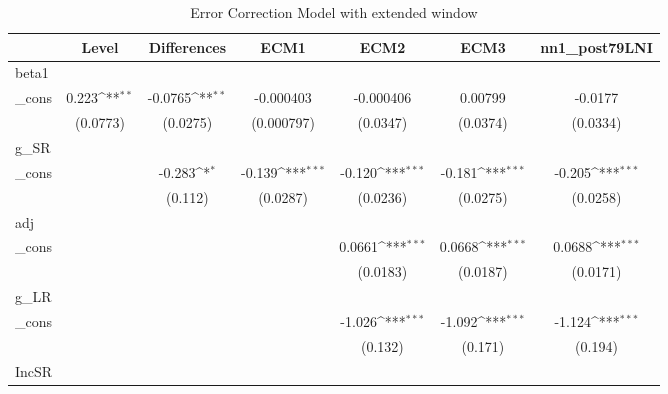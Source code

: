 \begin{table}[htbp]\centering
\def\sym#1{\ifmmode^{#1}\else\(^{#1}\)\fi}
\caption{Error Correction Model with extended window}
\begin{tabular}{l*{6}{c}}
\hline\hline
          &\multicolumn{1}{c}{Level}&\multicolumn{1}{c}{Differences}&\multicolumn{1}{c}{ECM1}&\multicolumn{1}{c}{ECM2}&\multicolumn{1}{c}{ECM3}&\multicolumn{1}{c}{nn1\_post79LNI}\\
\hline
beta1     &                  &                  &                  &                  &                  &                  \\
\_cons    &    0.223\sym{**} &  -0.0765\sym{**} &-0.000403         &-0.000406         &  0.00799         &  -0.0177         \\
          & (0.0773)         & (0.0275)         &(0.000797)         & (0.0347)         & (0.0374)         & (0.0334)         \\
[1em]
g\_SR      &                  &                  &                  &                  &                  &                  \\
\_cons    &                  &   -0.283\sym{*}  &   -0.139\sym{***}&   -0.120\sym{***}&   -0.181\sym{***}&   -0.205\sym{***}\\
          &                  &  (0.112)         & (0.0287)         & (0.0236)         & (0.0275)         & (0.0258)         \\
[1em]
adj       &                  &                  &                  &                  &                  &                  \\
\_cons    &                  &                  &                  &   0.0661\sym{***}&   0.0668\sym{***}&   0.0688\sym{***}\\
          &                  &                  &                  & (0.0183)         & (0.0187)         & (0.0171)         \\
[1em]
g\_LR      &                  &                  &                  &                  &                  &                  \\
\_cons    &                  &                  &                  &   -1.026\sym{***}&   -1.092\sym{***}&   -1.124\sym{***}\\
          &                  &                  &                  &  (0.132)         &  (0.171)         &  (0.194)         \\
[1em]
IncSR     &                  &                  &                  &                  &                  &                  \\

\end{tabular}
\end{table}
